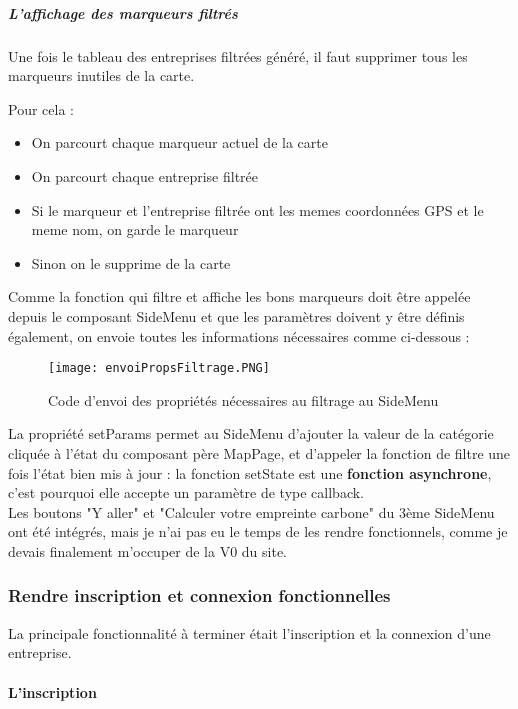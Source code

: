 \subparagraph{L'affichage des marqueurs filtrés}
Une fois le tableau des entreprises filtrées généré, il faut supprimer tous les marqueurs inutiles de la carte.

Pour cela : 
\begin{itemize}
    \item On parcourt chaque marqueur actuel de la carte
    \item On parcourt chaque entreprise filtrée
    \item Si le marqueur et l'entreprise filtrée ont les memes coordonnées GPS et le meme nom, on garde le marqueur
    \item Sinon on le supprime de la carte \\
\end{itemize}


Comme la fonction qui filtre et affiche les bons marqueurs doit être appelée depuis le composant SideMenu et que les paramètres doivent y être définis également, on envoie toutes les informations nécessaires comme ci-dessous :

\begin{figure}[H]
    \texttt{[image: envoiPropsFiltrage.PNG]}
    \caption{Code d'envoi des propriétés nécessaires au filtrage au SideMenu}
\end{figure}

La propriété setParams permet au SideMenu d'ajouter la valeur de la catégorie cliquée à l'état du composant père MapPage, et d'appeler la fonction de filtre une fois l'état bien mis à jour : la fonction setState est une \textbf{fonction asynchrone}, c'est pourquoi elle accepte un paramètre de type callback.\\

Les boutons "Y aller" et "Calculer votre empreinte carbone" du 3ème SideMenu ont été intégrés, mais je n'ai pas eu le temps de les rendre fonctionnels, comme je devais finalement m'occuper de la V0 du site.



\subsubsection{Rendre inscription et connexion fonctionnelles}
\label{inscripiton}

La principale fonctionnalité à terminer était l'inscription et la connexion d'une entreprise.

\paragraph{L'inscription}

